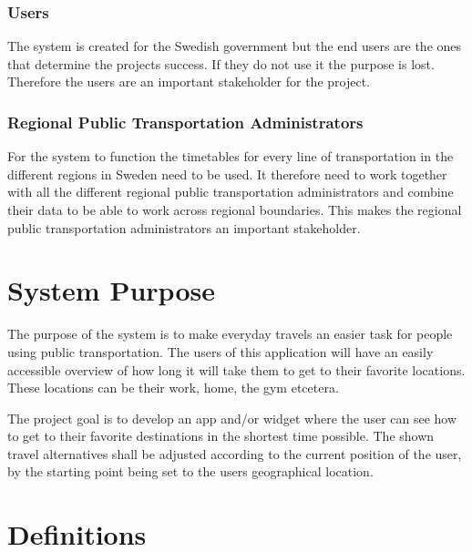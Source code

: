 \documentclass[a4paper]{article}
\begin{document}
			\subsubsection{Users}
			The system is created for the Swedish government but the end users are the ones that determine the projects success. If they do not use it the purpose is lost. Therefore the users are an important stakeholder for the project.

			\subsubsection{Regional Public Transportation Administrators}
			For the system to function the timetables for every line of transportation in the different regions in Sweden need to be used. It therefore need to work together with all the different regional public transportation administrators and combine their data to be able to work across regional boundaries. This makes the regional public transportation administrators an important stakeholder.
	
	\section{System Purpose} %
	The purpose of the system is to make everyday travels an easier task for people using public transportation. The users of this application will have an easily accessible overview of how long it will take them to get to their favorite locations. These locations can be their work, home, the gym etcetera.
	
	
The project goal is to develop an app and/or widget where the user can see how to get to their favorite destinations in the shortest time possible. The shown travel alternatives shall be adjusted according to the current position of the user, by the starting point being set to the users geographical location.
	\section{Definitions}
		
\end{document}
